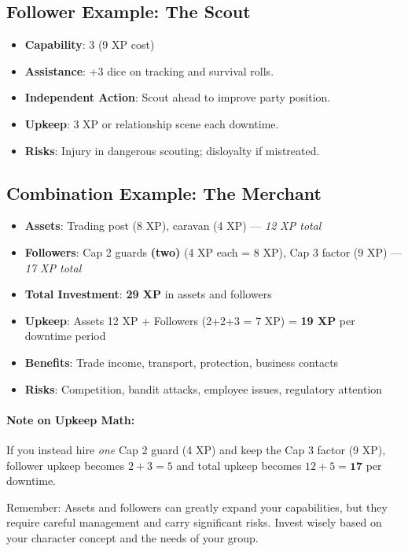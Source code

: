 \subsection*{Follower Example: The Scout}
\begin{itemize}
\item \textbf{Capability}: 3 (9 XP cost)
\item \textbf{Assistance}: +3 dice on tracking and survival rolls.
\item \textbf{Independent Action}: Scout ahead to improve party position.
\item \textbf{Upkeep}: 3 XP or relationship scene each downtime.
\item \textbf{Risks}: Injury in dangerous scouting; disloyalty if mistreated.
\end{itemize}

\subsection*{Combination Example: The Merchant}
\begin{itemize}
\item \textbf{Assets}: Trading post (8 XP), caravan (4 XP) --- \emph{12 XP total}
\item \textbf{Followers}: Cap 2 guards \textbf{(two)} (4 XP each = 8 XP), Cap 3 factor (9 XP) --- \emph{17 XP total}
\item \textbf{Total Investment}: \textbf{29 XP} in assets and followers
\item \textbf{Upkeep}: Assets 12 XP + Followers (2+2+3 = 7 XP) = \textbf{19 XP} per downtime period
\item \textbf{Benefits}: Trade income, transport, protection, business contacts
\item \textbf{Risks}: Competition, bandit attacks, employee issues, regulatory attention
\end{itemize}

\paragraph{Note on Upkeep Math:}
If you instead hire \emph{one} Cap 2 guard (4 XP) and keep the Cap 3 factor (9 XP), follower upkeep becomes $2+3=5$ and total upkeep becomes $12+5=\textbf{17}$ per downtime.

Remember: Assets and followers can greatly expand your capabilities, but they require careful management and carry significant risks. Invest wisely based on your character concept and the needs of your group.

